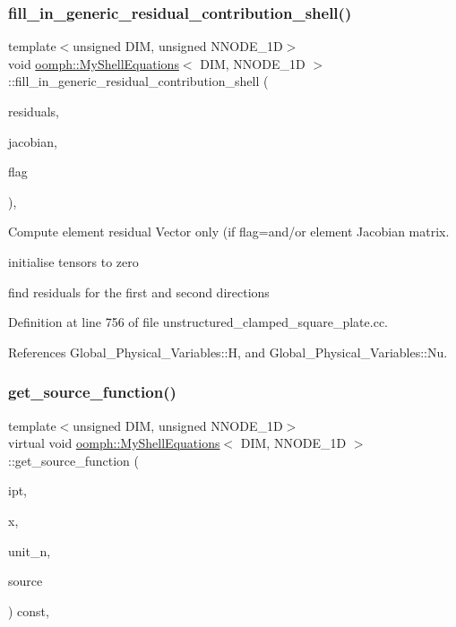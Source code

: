 \subsubsection{\texorpdfstring{fill\+\_\+in\+\_\+generic\+\_\+residual\+\_\+contribution\+\_\+shell()}{fill\_in\_generic\_residual\_contribution\_shell()}}
{\footnotesize\ttfamily template$<$unsigned D\+IM, unsigned N\+N\+O\+D\+E\+\_\+1D$>$ \\
void \hyperlink{classoomph_1_1MyShellEquations}{oomph\+::\+My\+Shell\+Equations}$<$ D\+IM, N\+N\+O\+D\+E\+\_\+1D $>$\+::fill\+\_\+in\+\_\+generic\+\_\+residual\+\_\+contribution\+\_\+shell (\begin{DoxyParamCaption}\item[{Vector$<$ double $>$ \&}]{residuals,  }\item[{Dense\+Matrix$<$ double $>$ \&}]{jacobian,  }\item[{const unsigned \&}]{flag }\end{DoxyParamCaption})\hspace{0.3cm}{\ttfamily [protected]}, {\ttfamily [virtual]}}



Compute element residual Vector only (if flag=and/or element Jacobian matrix. 

initialise tensors to zero

find residuals for the first and second directions 

Definition at line 756 of file unstructured\+\_\+clamped\+\_\+square\+\_\+plate.\+cc.



References Global\+\_\+\+Physical\+\_\+\+Variables\+::H, and Global\+\_\+\+Physical\+\_\+\+Variables\+::\+Nu.

\mbox{\label{classoomph_1_1MyShellEquations_a6c1858131a4ddd0c59a45449db7e182a}} 
\subsubsection{\texorpdfstring{get\+\_\+source\+\_\+function()}{get\_source\_function()}}
{\footnotesize\ttfamily template$<$unsigned D\+IM, unsigned N\+N\+O\+D\+E\+\_\+1D$>$ \\
virtual void \hyperlink{classoomph_1_1MyShellEquations}{oomph\+::\+My\+Shell\+Equations}$<$ D\+IM, N\+N\+O\+D\+E\+\_\+1D $>$\+::get\+\_\+source\+\_\+function (\begin{DoxyParamCaption}\item[{const unsigned \&}]{ipt,  }\item[{const Vector$<$ double $>$ \&}]{x,  }\item[{const Vector$<$ double $>$ \&}]{unit\+\_\+n,  }\item[{Vector$<$ double $>$ \&}]{source }\end{DoxyParamCaption}) const\hspace{0.3cm}{\ttfamily [inline]}, {\ttfamily [virtual]}}

